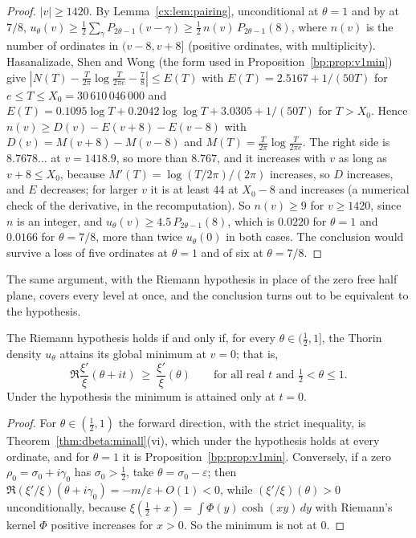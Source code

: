 \begin{proof}
$|v|\ge1420$. By Lemma~\ref{cx:lem:pairing}, unconditional at $\theta=1$ and by \cite{OAI26a} at $7/8$, $u_\theta(v)\ge\tfrac12\sum_\gamma P_{2\theta-1}(v-\gamma)\ge\tfrac12\,n(v)\,P_{2\theta-1}(8)$, where $n(v)$ is the number of ordinates in $(v-8,v+8]$ (positive ordinates, with multiplicity). Hasanalizade, Shen and Wong \cite{HSW22} (the form used in Proposition~\ref{bp:prop:v1min}) give $|N(T)-\tfrac T{2\pi}\log\tfrac T{2\pi e}-\tfrac78|\le E(T)$ with $E(T)=2.5167+1/(50T)$ for $e\le T\le X_0=30\,610\,046\,000$ and $E(T)=0.1095\log T+0.2042\log\log T+3.0305+1/(50T)$ for $T>X_0$. Hence $n(v)\ge D(v)-E(v+8)-E(v-8)$ with $D(v)=M(v+8)-M(v-8)$ and $M(T)=\tfrac T{2\pi}\log\tfrac T{2\pi e}$. The right side is $8.7678\ldots$ at $v=1418.9$, so more than $8.767$, and it increases with $v$ as long as $v+8\le X_0$, because $M'(T)=\log(T/2\pi)/(2\pi)$ increases, so $D$ increases, and $E$ decreases; for larger $v$ it is at least $44$ at $X_0-8$ and increases (a numerical check of the derivative, in the recomputation). So $n(v)\ge9$ for $v\ge1420$, since $n$ is an integer, and $u_\theta(v)\ge4.5\,P_{2\theta-1}(8)$, which is $0.0220$ for $\theta=1$ and $0.0166$ for $\theta=7/8$, more than twice $u_\theta(0)$ in both cases. The conclusion would survive a loss of five ordinates at $\theta=1$ and of six at $\theta=7/8$.
\end{proof}

The same argument, with the Riemann hypothesis in place of the zero free half plane, covers every level at once, and the conclusion turns out to be equivalent to the hypothesis.

\begin{theorem}\label{cx:thm:rhmin}
The Riemann hypothesis holds if and only if, for every $\theta\in(\tfrac12,1]$, the Thorin density $u_\theta$ attains its global minimum at $v=0$; that is,
\[
\Re\frac{\xi'}{\xi}(\theta+it)\ \ge\ \frac{\xi'}{\xi}(\theta)\qquad\text{for all real }t\text{ and }\tfrac12<\theta\le1 .
\]
Under the hypothesis the minimum is attained only at $t=0$.
\end{theorem}

\begin{proof}
For $\theta\in(\tfrac12,1)$ the forward direction, with the strict inequality, is Theorem~\ref{thm:dbeta:minall}(vi), which under the hypothesis holds at every ordinate, and for $\theta=1$ it is Proposition~\ref{bp:prop:v1min}. Conversely, if a zero $\rho_0=\sigma_0+i\gamma_0$ has $\sigma_0>\tfrac12$, take $\theta=\sigma_0-\varepsilon$; then $\Re(\xi'/\xi)(\theta+i\gamma_0)=-m/\varepsilon+O(1)<0$, while $(\xi'/\xi)(\theta)>0$ unconditionally, because $\xi(\tfrac12+x)=\int\Phi(y)\cosh(xy)\,dy$ with Riemann's kernel $\Phi$ positive increases for $x>0$. So the minimum is not at $0$.
\end{proof}

